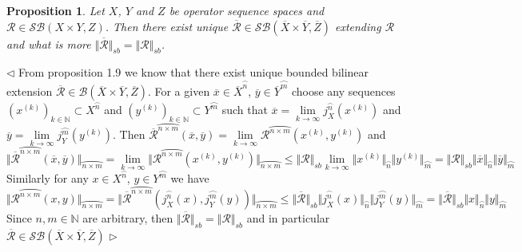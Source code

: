 \documentclass[12pt]{article}
\newtheorem{proposition}[theorem]{Proposition}
\newenvironment{proof}{\par $\triangleleft$}{$\triangleright$}
\begin{document}
\begin{proposition}\label{PrExtBilOpByCont} Let $X$, $Y$ and $Z$ be operator sequence spaces and $\mathcal{R}\in\mathcal{SB}(X\times Y,Z)$. Then there exist unique $\overline{\mathcal{R}}\in\mathcal{SB}(\overline{X}\times\overline{Y},\overline{Z})$ extending $\mathcal{R}$ and what is more $\Vert\overline{\mathcal{R}}\Vert_{sb}=\Vert\mathcal{R}\Vert_{sb}$.
\end{proposition}
\begin{proof} From proposition 1.9 \cite{DefFloTensNorOpId} we know that there exist unique bounded bilinear extension $\overline{\mathcal{R}}\in\mathcal{B}(\overline{X}\times\overline{Y},\overline{Z})$. For a given $\overline{x}\in \overline{X}^{\wideparen{n}}$, $\overline{y}\in \overline{Y}^{\wideparen{m}}$ choose any sequences $(x^{(k)})_{k\in\mathbb{N}}\subset X^{\wideparen{n}}$ and $(y^{(k)})_{k\in\mathbb{N}}\subset Y^{\wideparen{m}}$ such that $\overline{x}=\lim\limits_{k\to\infty} j_X^{\wideparen{n}}(x^{(k)})$ and $\overline{y}=\lim\limits_{k\to\infty} j_Y^{\wideparen{m}}(y^{(k)})$. Then $\overline{\mathcal{R}}^{\wideparen{n\times m}}(\overline{x},\overline{y})=\lim\limits_{k\to\infty}\mathcal{R}^{\wideparen{n\times m}}(x^{(k)}, y^{(k)})$ and
$$
\Vert\overline{\mathcal{R}}^{\wideparen{n\times m}}(\overline{x},\overline{y})\Vert_{\wideparen{n\times m}}
=\lim\limits_{k\to\infty}\Vert \mathcal{R}^{\wideparen{n\times m}}(x^{(k)}, y^{(k)})\Vert_{\wideparen{n\times m}}
\leq\Vert\mathcal{R}\Vert_{sb}\lim\limits_{k\to\infty}\Vert x^{(k)}\Vert_{\wideparen{n}}\Vert y^{(k)}\Vert_{\wideparen{m}}
=\Vert\mathcal{R}\Vert_{sb}\Vert\overline{x}\Vert_{\wideparen{n}}\Vert \overline{y}\Vert_{\wideparen{m}}
$$
Similarly for any $x\in X^{\wideparen{n}}$, $y\in Y^{\wideparen{m}}$ we have
$$
\Vert\mathcal{R}^{\wideparen{n\times m}}(x,y)\Vert_{\wideparen{n\times m}}
=\Vert\overline{\mathcal{R}}^{\wideparen{n\times m}}(j_X^{\wideparen{n}}(x),j_Y^{\wideparen{m}}(y))\Vert_{\wideparen{n\times m}}
\leq\Vert\overline{\mathcal{R}}\Vert_{sb}\Vert j_X^{\wideparen{n}}(x)\Vert_{\wideparen{n}}\Vert j_Y^{\wideparen{m}}(y)\Vert_{\wideparen{m}}
=\Vert\overline{\mathcal{R}}\Vert_{sb}\Vert x\Vert_{\wideparen{n}}\Vert y\Vert_{\wideparen{m}}
$$
Since $n,m\in\mathbb{N}$ are arbitrary, then $\Vert\overline{\mathcal{R}}\Vert_{sb}=\Vert\mathcal{R}\Vert_{sb}$ and in particular $\overline{\mathcal{R}}\in\mathcal{SB}(\overline{X}\times\overline{Y},\overline{Z})$
\end{proof}
\end{document}
